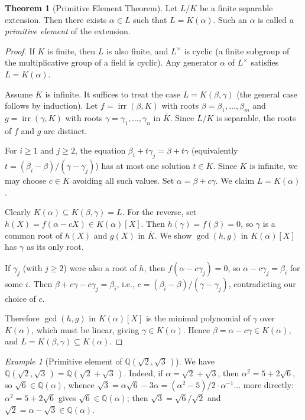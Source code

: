 \documentclass[12pt,a4paper,openany]{book}
\theoremstyle{definition}
\newtheorem{theorem}{Theorem}[chapter]
\theoremstyle{remark}
\newtheorem{example}{Example}[chapter]
\newcommand{\Q}{\mathbb{Q}}
\DeclareMathOperator{\irr}{irr}
\begin{document}
\begin{theorem}[Primitive Element Theorem]\label{thm:primitive-element}
Let $L/K$ be a finite separable extension.  Then there exists $\alpha\in L$
such that $L=K(\alpha)$.  Such an $\alpha$ is called a \emph{primitive
element} of the extension.
\end{theorem}

\begin{proof}
If $K$ is finite, then $L$ is also finite, and $L^{\times}$ is cyclic
(a finite subgroup of the multiplicative group of a field is cyclic).  Any
generator $\alpha$ of $L^{\times}$ satisfies $L=K(\alpha)$.

Assume $K$ is infinite.  It suffices to treat the case $L=K(\beta,\gamma)$
(the general case follows by induction).  Let
$f=\irr(\beta,K)$ with roots $\beta=\beta_{1},\dots,\beta_{m}$ and
$g=\irr(\gamma,K)$ with roots $\gamma=\gamma_{1},\dots,\gamma_{n}$ in
$\overline{K}$.  Since $L/K$ is separable, the roots of $f$ and $g$ are
distinct.

For $i\geq 1$ and $j\geq 2$, the equation
$\beta_{i}+t\gamma_{j}=\beta+t\gamma$ (equivalently
$t=(\beta_{i}-\beta)/(\gamma-\gamma_{j})$) has at most one solution
$t\in K$.  Since $K$ is infinite, we may choose $c\in K$ avoiding all such
values.  Set $\alpha=\beta+c\gamma$.  We claim $L=K(\alpha)$.

Clearly $K(\alpha)\subseteq K(\beta,\gamma)=L$.  For the reverse, set
$h(X)=f(\alpha-cX)\in K(\alpha)[X]$.  Then $h(\gamma)=f(\beta)=0$, so
$\gamma$ is a common root of $h(X)$ and $g(X)$ in $\overline{K}$.  We show
$\gcd(h,g)$ in $K(\alpha)[X]$ has $\gamma$ as its only root.

If $\gamma_{j}$ (with $j\geq 2$) were also a root of $h$, then
$f(\alpha-c\gamma_{j})=0$, so $\alpha-c\gamma_{j}=\beta_{i}$ for some $i$.
Then $\beta+c\gamma-c\gamma_{j}=\beta_{i}$, i.e.,
$c=(\beta_{i}-\beta)/(\gamma-\gamma_{j})$, contradicting our choice of $c$.

Therefore $\gcd(h,g)$ in $K(\alpha)[X]$ is the minimal polynomial of
$\gamma$ over $K(\alpha)$, which must be linear, giving
$\gamma\in K(\alpha)$.  Hence $\beta=\alpha-c\gamma\in K(\alpha)$, and
$L=K(\beta,\gamma)\subseteq K(\alpha)$.
\end{proof}

\begin{example}[Primitive element of $\Q(\sqrt{2},\sqrt{3}\,)$]
\label{ex:primitive-element}
We have $\Q(\sqrt{2},\sqrt{3}\,)=\Q(\sqrt{2}+\sqrt{3}\,)$.  Indeed,
if $\alpha=\sqrt{2}+\sqrt{3}$, then $\alpha^{2}=5+2\sqrt{6}$, so
$\sqrt{6}\in\Q(\alpha)$, whence $\sqrt{3}=\alpha\sqrt{6}-3\alpha=
(\alpha^{2}-5)/2\cdot\alpha^{-1}$... more directly: $\alpha^{2}=5+2\sqrt{6}$
gives $\sqrt{6}\in\Q(\alpha)$; then $\sqrt{3}=\sqrt{6}/\sqrt{2}$ and
$\sqrt{2}=\alpha-\sqrt{3}\in\Q(\alpha)$.
\end{example}
\end{document}
